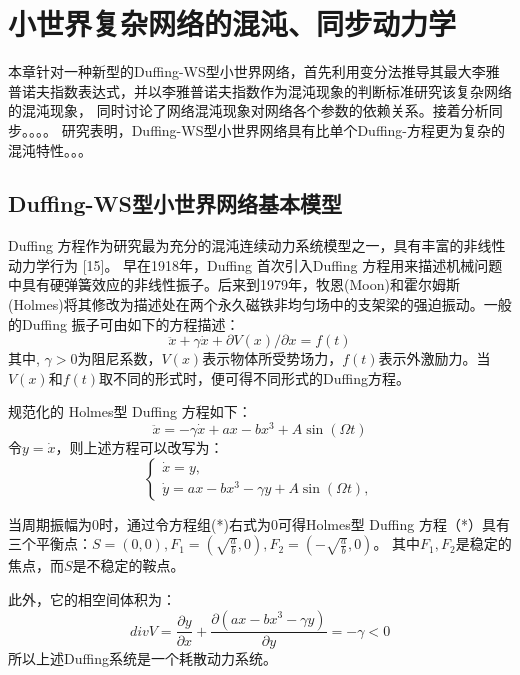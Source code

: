 \chapter{小世界复杂网络的混沌、同步动力学}
本章针对一种新型的Duffing-WS型小世界网络，首先利用变分法推导其最大李雅普诺夫指数表达式，并以李雅普诺夫指数作为混沌现象的判断标准研究该复杂网络的混沌现象，
同时讨论了网络混沌现象对网络各个参数的依赖关系。接着分析同步。。。。
研究表明，Duffing-WS型小世界网络具有比单个Duffing-方程更为复杂的混沌特性。。。
\section{Duffing-WS型小世界网络基本模型}

Duffing 方程作为研究最为充分的混沌连续动力系统模型之一，具有丰富的非线性动力学行为 [15]。
早在1918年，Duffing 首次引入Duffing 方程用来描述机械问题中具有硬弹簧效应的非线性振子。后来到1979年，牧恩(Moon)和霍尔姆斯(Holmes)将其修改为描述处在两个永久磁铁非均匀场中的支架梁的强迫振动。一般的Duffing 振子可由如下的方程描述：
\begin{equation}
    \ddot{x}+\gamma \dot{x}+\partial V(x)/\partial x = f(t)
\end{equation}
其中, $\gamma>0$为阻尼系数，$V(x)$表示物体所受势场力，$f(t)$表示外激励力。当$V(x)$和$f(t)$取不同的形式时，便可得不同形式的Duffing方程。

规范化的 Holmes型 Duffing 方程如下：
\begin{equation}
    \ddot{x}=-\gamma \dot{x}+a x-b x^{3}+A \sin (\Omega t)
\end{equation}
令$y=\dot{x}$，则上述方程可以改写为：
\begin{equation}
\left\{
  \begin{array}{ll}
    \dot{x}=y, \\
    \dot{y}=a x-b x^{3}-\gamma y+A \sin (\Omega t),
  \end{array}
\right.
\end{equation}

当周期振幅为0时，通过令方程组(*)右式为0可得Holmes型 Duffing 方程（*）具有三个平衡点：$S=(0,0),F_1=\left(\sqrt{\frac{a}{b}},0\right),F_2=\left(-\sqrt{\frac{a}{b}},0\right)$。
其中$F_1,F_2$是稳定的焦点，而$S$是不稳定的鞍点。

此外，它的相空间体积为：
\begin{equation}
div V = \frac{\partial y}{\partial x}+\frac{\partial(a x-b x^{3}-\gamma y)}{\partial y} = -\gamma <0
\end{equation}
所以上述Duffing系统是一个耗散动力系统。

